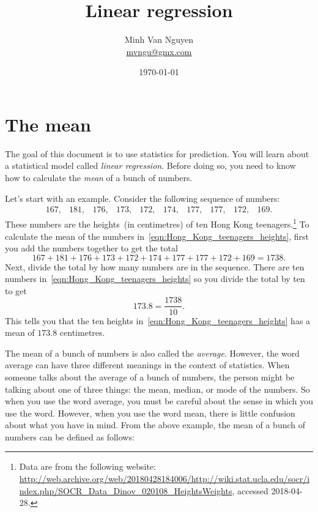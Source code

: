\documentclass[a4paper,oneside,12pt]{article}
\begin{document}
\title{\Large\bf Linear regression}
\author{%
  Minh Van Nguyen \\
  \url{mvngu@gmx.com}
}
\date{\today}
\maketitle



\section{The mean}
\label{sec:mean}

The goal of this document is to use statistics for prediction.  You
will learn about a statistical model called \emph{linear regression}.
Before doing so, you need to know how to calculate the \emph{mean} of
a bunch of numbers.

Let's start with an example.  Consider the following sequence of
numbers:
\begin{equation}
\label{eqn:Hong_Kong_teenagers_heights}
\begin{matrix}
167, & 181, & 176, & 173, & 172, & 174, & 177, & 177, & 172, & 169.
\end{matrix}
\end{equation}
These numbers are the heights~(in centimetres) of ten Hong Kong
teenagers.\footnote{
  Data are from the following website:
  \url{http://web.archive.org/web/20180428184006/http://wiki.stat.ucla.edu/socr/index.php/SOCR_Data_Dinov_020108_HeightsWeights},
  accessed 2018-04-28.
}
To calculate the mean of the numbers
in~\eqref{eqn:Hong_Kong_teenagers_heights}, first you add the numbers
together to get the total
\[
167 + 181 + 176 + 173 + 172 + 174 + 177 + 177 + 172 + 169
=
1738.
\]
Next, divide the total by how many numbers are in the sequence.  There
are ten numbers in~\eqref{eqn:Hong_Kong_teenagers_heights} so you
divide the total by ten to get
\[
173.8
=
\frac{1738}{10}.
\]
This tells you that the ten heights
in~\eqref{eqn:Hong_Kong_teenagers_heights} has a mean of $173.8$
centimetres.

The mean of a bunch of numbers is also called the \emph{average}.
However, the word average can have three different meanings in the
context of statistics.  When someone talks about the average of a
bunch of numbers, the person might be talking about one of three
things: the mean, median, or mode of the numbers.  So when you use the
word average, you must be careful about the sense in which you use the
word.  However, when you use the word mean, there is little confusion
about what you have in mind.  From the above example, the mean of a
bunch of numbers can be defined as follows:
\end{document}
